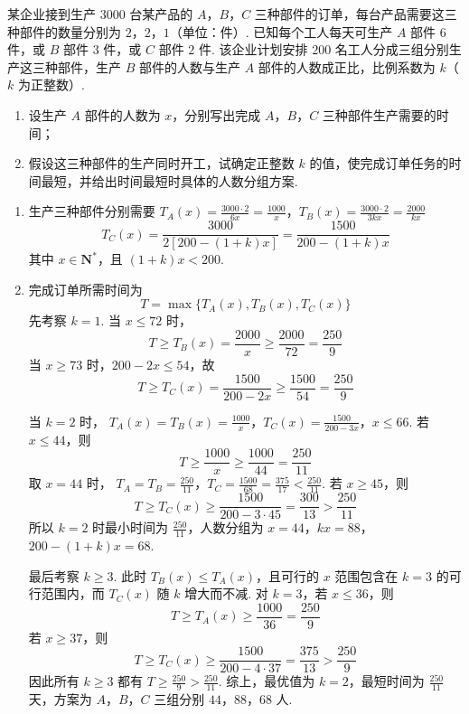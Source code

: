 \begin{problem}
某企业接到生产 \(3000\) 台某产品的 \(A\)，\(B\)，\(C\) 三种部件的订单，每台产品需要这三种部件的数量分别为 \(2\)，\(2\)，\(1\)（单位：件）. 已知每个工人每天可生产 \(A\) 部件 \(6\) 件，或 \(B\) 部件 \(3\) 件，或 \(C\) 部件 \(2\) 件. 该企业计划安排 \(200\) 名工人分成三组分别生产这三种部件，生产 \(B\) 部件的人数与生产 \(A\) 部件的人数成正比，比例系数为 \(k\)（\(k\) 为正整数）.

\begin{enumerate}
\item 设生产 \(A\) 部件的人数为 \(x\)，分别写出完成 \(A\)，\(B\)，\(C\) 三种部件生产需要的时间；
\item 假设这三种部件的生产同时开工，试确定正整数 \(k\) 的值，使完成订单任务的时间最短，并给出时间最短时具体的人数分组方案.
\end{enumerate}

\begin{solution}
\begin{enumerate}
\item 生产三种部件分别需要
\(T_A(x)=\frac{3000\cdot2}{6x}=\frac{1000}{x}\)，\(T_B(x)=\frac{3000\cdot2}{3kx}=\frac{2000}{kx}\)
\[
T_C(x)=\frac{3000}{2[200-(1+k)x]}
=\frac{1500}{200-(1+k)x}
\]
其中 \(x\in\mathbf N^*\)，且 \((1+k)x<200\).

\item 完成订单所需时间为
\[
T=\max\{T_A(x),T_B(x),T_C(x)\}
\]
先考察 \(k=1\). 当 \(x\leqslant72\) 时，
\[
T\geqslant T_B(x)=\frac{2000}{x}\geqslant\frac{2000}{72}=\frac{250}{9}
\]
当 \(x\geqslant73\) 时，\(200-2x\leqslant54\)，故
\[
T\geqslant T_C(x)=\frac{1500}{200-2x}\geqslant\frac{1500}{54}=\frac{250}{9}
\]

当 \(k=2\) 时，
\(T_A(x)=T_B(x)=\frac{1000}{x}\)，\(T_C(x)=\frac{1500}{200-3x}\)，\(x\leqslant66\).
若 \(x\leqslant44\)，则
\[
T\geqslant\frac{1000}{x}\geqslant\frac{1000}{44}=\frac{250}{11}
\]
取 \(x=44\) 时，
\(T_A=T_B=\frac{250}{11}\)，\(T_C=\frac{1500}{68}=\frac{375}{17}<\frac{250}{11}\).
若 \(x\geqslant45\)，则
\[
T\geqslant T_C(x)\geqslant\frac{1500}{200-3\cdot45}
=\frac{300}{13}>\frac{250}{11}
\]
所以 \(k=2\) 时最小时间为 \(\frac{250}{11}\)，人数分组为
\(x=44\)，\(kx=88\)，\(200-(1+k)x=68\).

最后考察 \(k\geqslant3\). 此时 \(T_B(x)\leqslant T_A(x)\)，且可行的 \(x\) 范围包含在 \(k=3\) 的可行范围内，而 \(T_C(x)\) 随 \(k\) 增大而不减. 对 \(k=3\)，若 \(x\leqslant36\)，则
\[
T\geqslant T_A(x)\geqslant\frac{1000}{36}=\frac{250}{9}
\]
若 \(x\geqslant37\)，则
\[
T\geqslant T_C(x)\geqslant\frac{1500}{200-4\cdot37}
=\frac{375}{13}>\frac{250}{9}
\]
因此所有 \(k\geqslant3\) 都有 \(T\geqslant\frac{250}{9}>\frac{250}{11}\). 综上，最优值为 \(k=2\)，最短时间为 \(\frac{250}{11}\) 天，方案为 \(A\)，\(B\)，\(C\) 三组分别 \(44\)，\(88\)，\(68\) 人.
\end{enumerate}
\end{solution}
\end{problem}

